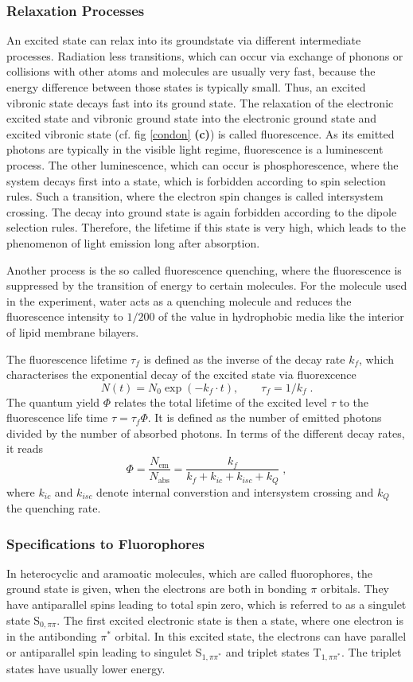 \documentclass[draft]{scrartcl}
\numberwithin{equation}{section}
\numberwithin{figure}{section}
\numberwithin{table}{section}
\newcommand{\eq}[2]{\begin{equation}#1\label{#2}\end{equation}}
\begin{document}
\subsubsection{Relaxation Processes}
An excited state can relax into its groundstate via different intermediate processes. Radiation less transitions, which can occur via exchange of phonons or collisions with other atoms and molecules are usually very fast, because the energy difference between those states is typically small. Thus, an excited vibronic state decays fast into its ground state. The relaxation of the electronic excited state and vibronic ground state into the electronic ground state and excited vibronic state (cf. fig \ref{condon} \textbf{(c)}) is called fluorescence. As its emitted photons are typically in the visible light regime, fluorescence is a luminescent process. The other luminescence, which can occur is phosphorescence, where the system decays first into a state, which is forbidden according to spin selection rules. Such a transition, where the electron spin changes is called intersystem crossing. The decay into ground state is again forbidden according to the dipole selection rules. Therefore, the lifetime if this state is very high, which leads to the phenomenon of light emission long after absorption.

Another process is the so called fluorescence quenching, where the fluorescence is suppressed by the transition of energy to certain molecules. For the molecule used in the experiment, water acts as a quenching molecule and reduces the fluorescence intensity to $1/200$ of the value in hydrophobic media like the interior of lipid membrane bilayers.

The fluorescence lifetime $\tau_f$ is defined as the inverse of the decay rate $k_f$, which characterises the exponential decay of the excited state via fluorexcence
\eq{N(t) =N_0 \exp (-k_f \cdot  t) , \qquad \tau_f=1/k_f \; .}{rate}
The quantum yield $\Phi$ relates the total lifetime of the excited level $\tau$ to the fluorescence life time $\tau = \tau_f \Phi$. It is defined as the number of emitted photons divided by the number of absorbed photons. In terms of the different decay rates, it reads
\eq{\Phi = \frac{N_\text{em}}{N_\text{abs}} = \frac{k_f}{k_f +k_{ic} + k_{isc} + k_Q} \; ,}{yield}
where $k_{ic}$ and $k_{isc}$ denote internal converstion and intersystem crossing and $k_Q$ the quenching rate.



\subsubsection{Specifications to Fluorophores}
In heterocyclic and aramoatic molecules, which are called fluorophores, the ground state is given, when the electrons are both in bonding $\pi$ orbitals. They have antiparallel spins leading to total spin zero, which is referred to as a singulet state S$_{0,\pi\pi}$. The first excited electronic state is then a state, where one electron is in the antibonding $\pi^*$ orbital. In this excited state, the electrons can have parallel or antiparallel spin leading to singulet S$_{1, \pi \pi^*}$ and triplet states T$_{1, \pi \pi^*}$. The triplet states have usually lower energy.
\end{document}

